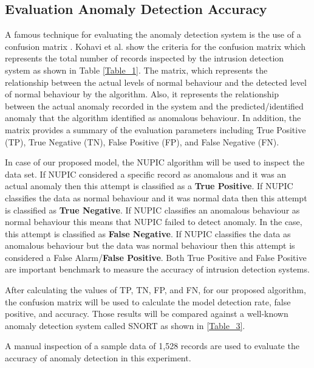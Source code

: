 \documentclass[sigconf]{acmart}
\begin{document}
\subsection{Evaluation Anomaly Detection Accuracy}
A famous technique for evaluating the anomaly detection system is the use of a confusion matrix \cite{kohavi1998confusion}. Kohavi et al. \cite{kohavi1998confusion} show the criteria for the confusion matrix which represents the total number of records inspected by the intrusion detection system as shown in Table \ref{Table_1}. The matrix, which represents the relationship between the actual levels of normal behaviour and the detected level of normal behaviour by the algorithm. Also, it represents the relationship between the actual anomaly recorded in the system and the predicted/identified anomaly that the algorithm identified as anomalous behaviour.  In addition, the matrix provides a summary of the evaluation parameters including True Positive (TP), True Negative (TN), False Positive (FP), and False Negative (FN).  
 
In case of our proposed model, the NUPIC algorithm will be used to inspect the data set. If NUPIC considered a specific record as anomalous and it was an actual anomaly then this attempt is classified as a \textbf{True Positive}. If NUPIC classifies the data as normal behaviour and it was normal data then this attempt is classified as \textbf{True Negative}. If NUPIC classifies an anomalous behaviour as normal behaviour this means that NUPIC failed to detect anomaly. In the case, this attempt is classified as \textbf{False Negative}. If NUPIC classifies the data as anomalous behaviour but the data was normal behaviour then this attempt is considered a False Alarm/\textbf{False Positive}. Both True Positive and False Positive are important benchmark to measure the accuracy of intrusion detection systems. 

After calculating the values of TP, TN, FP, and FN, for our proposed algorithm, the confusion matrix will be used to calculate the model detection rate, false positive, and accuracy. Those results will be compared against a well-known anomaly detection system called SNORT as shown in \ref{Table_3}.   

A manual inspection of  a sample data of 1,528 records are used to evaluate the accuracy of anomaly detection in this experiment.  
\begin{table}[h!]
\centering

\caption{Results of the proposed anomalies detection model on confusion matrix}
\end{table}
\end{document}
